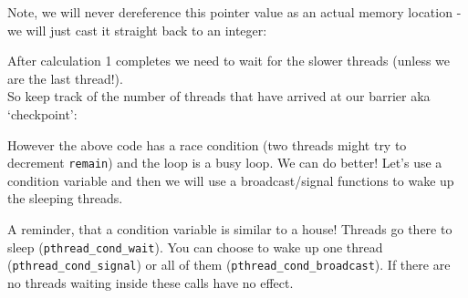 Note, we will never dereference this pointer value as an actual memory
location - we will just cast it straight back to an integer:

\begin{Shaded}
\begin{Highlighting}[]
  
   
   
    \NormalTok{\}}
\end{Highlighting}
\end{Shaded}

After calculation 1 completes we need to wait for the slower threads
(unless we are the last thread!).\\So keep track of the number of
threads that have arrived at our barrier aka `checkpoint':

\begin{Shaded}
\begin{Highlighting}[]
 


 \NormalTok{) \{} \NormalTok{\}}
 \NormalTok{\{}
   \NormalTok{) \{ } \NormalTok{\}}
\NormalTok{\}}
\end{Highlighting}
\end{Shaded}

However the above code has a race condition (two threads might try to
decrement \texttt{remain}) and the loop is a busy loop. We can do
better! Let's use a condition variable and then we will use a
broadcast/signal functions to wake up the sleeping threads.

A reminder, that a condition variable is similar to a house! Threads go
there to sleep (\texttt{pthread\_cond\_wait}). You can choose to wake up
one thread (\texttt{pthread\_cond\_signal}) or all of them
(\texttt{pthread\_cond\_broadcast}). If there are no threads waiting
inside these calls have no effect.

